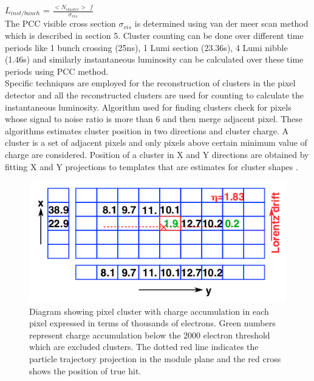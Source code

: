 $L_{inst/bunch}$ = $\frac{<N_{cluster}> \:\: f}{\sigma_{vis}}$ \\

The PCC visible cross section $\sigma_{vis}$ is determined using van der meer scan method which is described in section 5. Cluster counting can be done over different time periods like 1 bunch crossing (25ns), 1 Lumi section (23.36s), 4 Lumi nibble (1.46s) and similarly instantaneous luminosity can be calculated over these time periods using PCC method. \\

Specific techniques are employed for the reconstruction of clusters in the pixel detector and all the reconstructed clusters are used for counting to calculate the instantaneous luminosity. Algorithm used for finding clusters check for pixels whose signal to noise ratio is more than 6 and then merge adjacent pixel. These algorithms estimates cluster position in two directions and cluster charge. A cluster is a set of adjacent pixels and only pixels above certain minimum value of charge are considered. Position of a cluster in X and Y directions are obtained by fitting X and Y projections to templates that are estimates for cluster shapes \cite{Chatrchyan:2014fea}.


\begin{figure}[H]
  \centering
  \includegraphics[width=0.6\columnwidth]{./pixel_reco.png}
  \caption{ \onehalfspacing Diagram showing pixel cluster with charge accumulation in each pixel expressed in terms of thousands of electrons. Green numbers represent charge accumulation below the 2000 electron threshold which are excluded clusters. The dotted red line indicates the particle trajectory projection in the module plane and the red cross shows the position of true hit.}
  \label{fig:CMS}
\end{figure}








